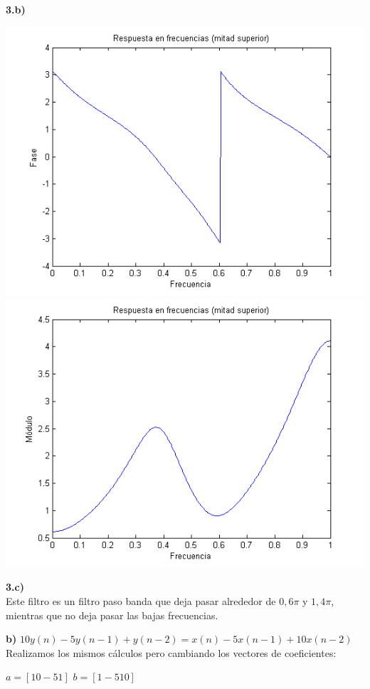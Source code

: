 \documentclass[a4paper,12pt]{article}
\begin{document}
\textbf{3.b)}\\

\begin{center}
\includegraphics[width=.8 \textwidth]{ejercicio-4-3-b-fase.png}\\
\includegraphics[width=.8 \textwidth]{ejercicio-4-3-b-modulo.png}
\end{center}

\textbf{3.c)}\\

Este filtro es un filtro paso banda que deja pasar alrededor de $0,6 \pi$ y $1,4 \pi$, mientras que no deja pasar las bajas frecuencias.



\textbf{b)} $10 y(n) - 5 y(n-1) + y(n-2) = x(n) - 5 x(n-1) + 10 x(n-2)$ \\

Realizamos los mismos cálculos pero cambiando los vectores de coeficientes:

$ a = [10 -5 1] $
$ b = [1 -5 10] $
\end{document}
